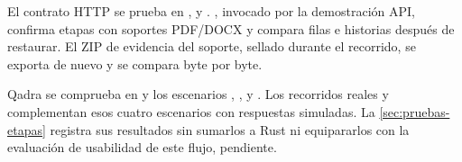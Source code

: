 {\raggedright El contrato HTTP se prueba en ,  y . , invocado por la demostración API, confirma etapas con soportes PDF/DOCX y compara filas e historias después de restaurar. El ZIP de evidencia del soporte, sellado durante el recorrido, se exporta de nuevo y se compara byte por byte.\par}

{\raggedright Qadra se comprueba en  y los escenarios , ,  y . Los recorridos reales  y  complementan esos cuatro escenarios con respuestas simuladas. La \cref{sec:pruebas-etapas} registra sus resultados sin sumarlos a Rust ni equipararlos con la evaluación de usabilidad de este flujo, pendiente.
\par}
